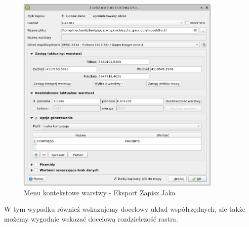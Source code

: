 \documentclass[a4paper,11pt, onecolumn, openany]{memoir}
\begin{document}
	\begin{figure}[!ht]
	\centering
	\includegraphics[width=10cm]{crs-cwiczenie2-zapisz-raster}
	\caption{Menu kontekstowe warstwy - Eksport Zapisz Jako}
\end{figure}
W tym wypadku również wskazujemy docelowy układ współrzędnych, ale także możemy wygodnie wskazać docelową rozdzielczość rastra.
\end{document}
